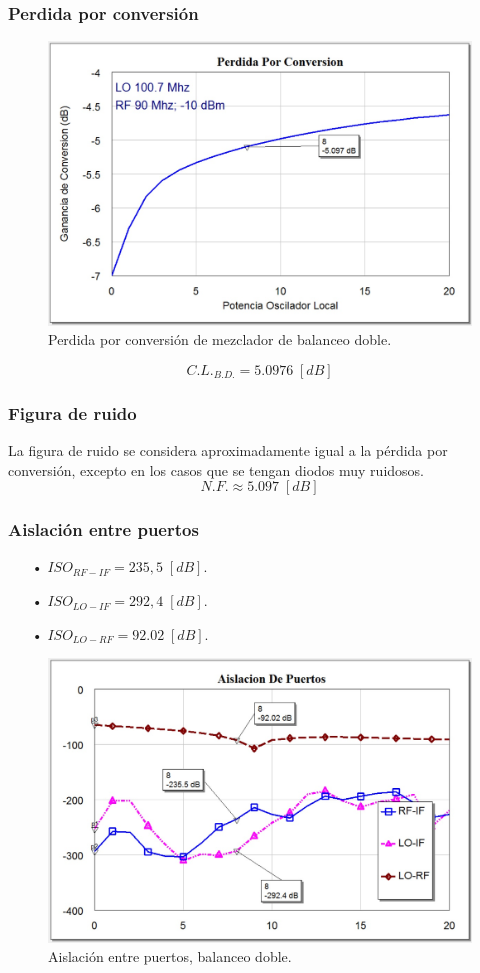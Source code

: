 \documentclass[twocolumn]{article}
\begin{document}
\subsubsection{Perdida por conversión}
%
\begin{figure}[h]
  \centering    
	\includegraphics[scale=0.3]{imagenes/CL3.jpg}
	\caption{Perdida por conversión de mezclador de balanceo doble.}\label{fig:CL3}
\end{figure}
\[C.L._{B.D.} = 5.097 6 \; [dB] \]
%
\subsubsection{Figura de ruido}
%
La figura de ruido se considera aproximadamente igual a la pérdida por conversión, excepto en los casos que se tengan diodos muy ruidosos.
\[N.F. \approx 5.097 \; [dB] \]
%
\subsubsection{Aislación entre puertos}
%
\begin{itemize}\itemsep0em
\item[•]  $ISO_{RF-IF} = 235,5 \; [dB]$.
\item[•]  $ISO_{LO-IF} = 292,4 \; [dB]$.
\item[•]  $ISO_{LO-RF} = 92.02 \; [dB]$.
\end{itemize}
%
\begin{figure}[h]
  \centering    
	\includegraphics[scale=0.3]{imagenes/ISO3.jpg}
	\caption{Aislación entre puertos, balanceo doble.}\label{fig:ISO3}
\end{figure}
\clearpage
%
\end{document}
